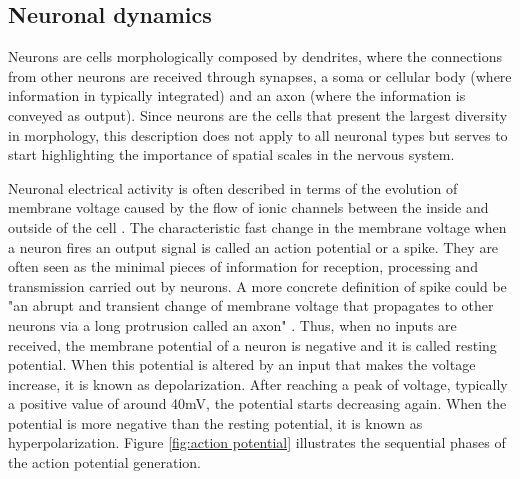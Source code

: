 \subsection{Neuronal dynamics}

Neurons are cells morphologically composed by dendrites, where the connections from other neurons are received through synapses, a soma or cellular body (where information in typically integrated) and an axon (where the information is conveyed as output). Since neurons are the cells that present the largest diversity in morphology, this description does not apply to all neuronal types but serves to start highlighting the importance of spatial scales in the nervous system. 

Neuronal electrical activity is often described in terms of the evolution of membrane voltage caused by the flow of ionic channels between the inside and outside of the cell \parencite{kandel_principles_2012}. The characteristic fast change in the membrane voltage when a neuron fires an output signal is called an action potential or a spike. They are often seen as the minimal pieces of information for reception, processing and transmission carried out by neurons. A more concrete definition of spike could be "an abrupt and transient change of membrane voltage that propagates to other neurons via a long protrusion called an axon" \parencite{izhikevich_dynamical_2007}. Thus, when no inputs are received, the membrane potential of a neuron is negative and it is called resting potential. When this potential is altered by an input that makes the voltage increase, it is known as depolarization. After reaching a peak of voltage, typically a positive value of around 40mV, the potential starts decreasing again. When the potential is more negative than the resting potential, it is known as hyperpolarization. Figure \ref{fig:action potential} illustrates the sequential phases of the action potential generation. 

